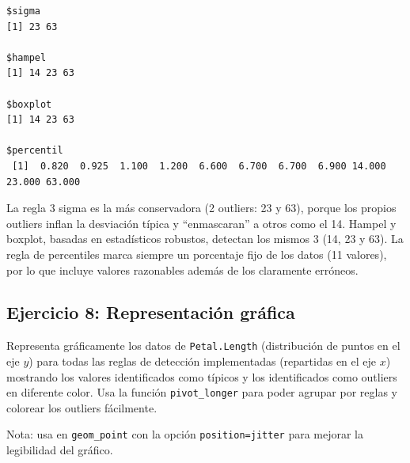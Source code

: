 \documentclass[
]{article}
\begin{document}
\begin{verbatim}
$sigma
[1] 23 63

$hampel
[1] 14 23 63

$boxplot
[1] 14 23 63

$percentil
 [1]  0.820  0.925  1.100  1.200  6.600  6.700  6.700  6.900 14.000 23.000 63.000
\end{verbatim}

La regla 3 sigma es la más conservadora (2 outliers: 23 y 63), porque
los propios outliers inflan la desviación típica y ``enmascaran'' a
otros como el 14. Hampel y boxplot, basadas en estadísticos robustos,
detectan los mismos 3 (14, 23 y 63). La regla de percentiles marca
siempre un porcentaje fijo de los datos (11 valores), por lo que incluye
valores razonables además de los claramente erróneos.

\subsection{Ejercicio 8: Representación
gráfica}\label{ejercicio-8-representaciuxf3n-gruxe1fica}

Representa gráficamente los datos de \texttt{Petal.Length} (distribución
de puntos en el eje \(y\)) para todas las reglas de detección
implementadas (repartidas en el eje \(x\)) mostrando los valores
identificados como típicos y los identificados como outliers en
diferente color. Usa la función \texttt{pivot\_longer} para poder
agrupar por reglas y colorear los outliers fácilmente.

Nota: usa en \texttt{geom\_point} con la opción
\texttt{position=\textquotesingle{}jitter\textquotesingle{}} para
mejorar la legibilidad del gráfico.
\end{document}
